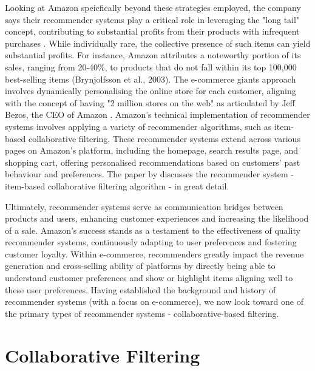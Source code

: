 Looking at Amazon speicfically beyond these strategies employed, the company says their recommender systems play a critical role in leveraging the "long tail" concept, contributing to substantial profits from their products with infrequent purchases \cite{leino2007case}. While individually rare, the collective presence of such items can yield substantial profits. For instance, Amazon attributes a noteworthy portion of its sales, ranging from 20-40\%, to products that do not fall within its top 100,000 best-selling items (Brynjolfsson et al., 2003). The e-commerce giants approach involves dynamically personalising the online store for each customer, aligning with the concept of having "2 million stores on the web" as articulated by Jeff Bezos, the CEO of Amazon \cite{linden2003amazon}. Amazon's technical implementation of recommender systems involves applying a variety of recommender algorithms, such as item-based collaborative filtering. These recommender systems extend across various pages on Amazon's platform, including the homepage, search results page, and shopping cart, offering personalised recommendations based on customers' past behaviour and preferences. The paper by \cite{linden2003amazon} discusses the recommender system - item-based collaborative filtering algorithm - in great detail. 

Ultimately, recommender systems serve as communication bridges between products and users, enhancing customer experiences and increasing the likelihood of a sale. Amazon's success stands as a testament to the effectiveness of quality recommender systems, continuously adapting to user preferences and fostering customer loyalty. Within e-commerce, recommenders greatly impact the revenue generation and cross-selling ability of platforms by directly being able to understand customer preferences and show or highlight items aligning well to these user preferences. Having established the background and history of recommender systems (with a focus on e-commerce), we now look toward one of the primary types of recommender systems - collaborative-based filtering.  


\section{Collaborative Filtering}
\label{sec:2 Collaborative Filtering}

